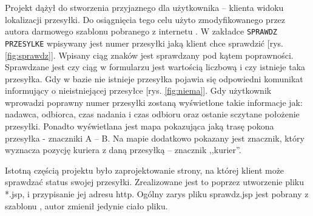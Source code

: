 \documentclass[eng,printmode,oneside]{mgr}
\begin{document}
Projekt dążył do stworzenia przyjaznego dla użytkownika -- klienta widoku
lokalizacji przesyłki. Do osiągnięcia tego celu użyto zmodyfikowanego przez
autora darmowego szablonu pobranego z internetu \cite{szablon}. W zakładce
\texttt{SPRAWDZ PRZESYLKE} wpisywany jest numer przesyłki jaką klient chce
sprawdzić [rys.
\ref{fig:sprawdz}]. Wpisany ciąg znaków jest sprawdzany pod kątem poprawności.
Sprawdzane jest czy ciąg w formularzu jest wartością liczbową i czy istnieje
taka przesyłka. Gdy w bazie nie istnieje przesyłka pojawia się odpowiedni komunikat
informujący o nieistniejącej przesyłce [rys. \ref{fig:niema}]. Gdy użytkownik
wprowadzi poprawny numer przesyłki zostaną wyświetlone takie informacje jak:
nadawca, odbiorca, czas nadania i czas odbioru oraz ostanie sczytane położenie
przesyłki. Ponadto wyświetlana jest mapa pokazująca jaką trasę pokona przesyłka
- znaczniki A -- B. Na mapie dodatkowo pokazany jest znacznik, który wyznacza
pozycję kuriera z daną przesyłką -- znacznik ,,kurier''.

Istotną częścią projektu było zaprojektowanie strony, na której
klient może sprawdzać status swojej przesyłki. Zrealizowane jest to poprzez
utworzenie pliku *.jsp, i przypisanie jej adresu http. Ogólny zarys pliku sprawdz.jsp jest
pobrany z szablonu \cite{szablon}, autor zmienił jedynie ciało pliku. 
\end{document}
